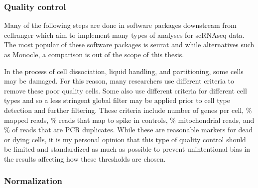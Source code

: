 \subsubsection{Quality control}

\par{
Many of the following steps are done in software packages downstream from cellranger which aim to implement many types of analyses for scRNAseq data. The most popular of these software packages is seurat\cite{seurat1}\cite{seurat2} and while alternatives such as Monocle\cite{monocle}, a comparison is out of the scope of this thesis.
} 

\par{ In the process of cell dissociation, liquid handling, and partitioning, some cells may be damaged. For this reason, many researchers use different criteria to remove these poor quality cells. Some also use different criteria for different cell types and so a less stringent global filter may be applied prior to cell type detection and further filtering. These criteria include number of genes per cell, \% mapped reads, \% reads that map to spike in controls, \% mitochondrial reads, and \% of reads that are PCR duplicates. While these are reasonable markers for dead or dying cells\cite{osorio}\cite{ilicic}, it is my personal opinion that this type of quality control should be limited and standardized as much as possible to prevent unintentional bias in the results affecting how these thresholds are chosen. 
}

\subsubsection{Normalization}\label{section:normalize}

